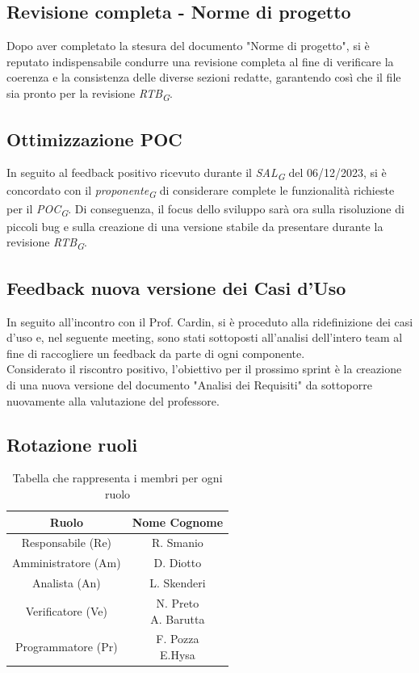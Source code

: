 \documentclass{article}
\begin{document}
    \subsection{Revisione completa - Norme di progetto}
    Dopo aver completato la stesura del documento "Norme di progetto", si è reputato indispensabile condurre una revisione completa al fine di verificare la coerenza e la consistenza delle diverse sezioni redatte, garantendo così che il file sia pronto per la revisione \textit{RTB}\textsubscript{\textit{G}}.  
    \subsection{Ottimizzazione POC}
    In seguito al feedback positivo ricevuto durante il \textit{SAL}\textsubscript{\textit{G}} del 06/12/2023, si è concordato con il \textit{proponente}\textsubscript{\textit{G}} di considerare complete le funzionalità richieste per il \textit{POC}\textsubscript{\textit{G}}. Di conseguenza, il focus dello sviluppo sarà ora sulla risoluzione di piccoli bug e sulla creazione di una versione stabile da presentare durante la revisione \textit{RTB}\textsubscript{\textit{G}}.  
    \subsection{Feedback nuova versione dei Casi d'Uso}
    In seguito all'incontro con il Prof. Cardin, si è proceduto alla ridefinizione dei casi d'uso e, nel seguente meeting, sono stati sottoposti all'analisi dell'intero team al fine di raccogliere un feedback da parte di ogni componente.\\
    Considerato il riscontro positivo, l'obiettivo per il prossimo sprint è la creazione di una nuova versione del documento "Analisi dei Requisiti" da sottoporre nuovamente alla valutazione del professore.
    \subsection{Rotazione ruoli} 

    \begin{table}[H]
        \centering
        \begin{tabular}{|c|c|} 
            \hline
            \textbf{Ruolo} & \textbf{Nome Cognome} \\
            \hline \hline
            Responsabile (Re) & R. Smanio\\ 
            \hline
            Amministratore (Am) & D. Diotto\\ 
            \hline
            Analista (An) & L. Skenderi \\
            \hline
            Verificatore (Ve) & \makecell{N. Preto\\A. Barutta } \\
            \hline
            Programmatore (Pr) & \makecell{F. Pozza\\E.Hysa } \\
            \hline
        \end{tabular}
        \caption{Tabella che rappresenta i membri per ogni ruolo}
    \end{table}
\end{document}
